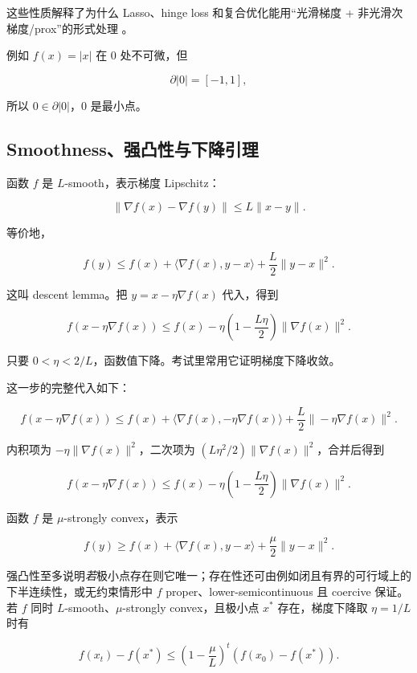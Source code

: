 这些性质解释了为什么 Lasso、hinge loss 和复合优化能用“光滑梯度 + 非光滑次梯度/prox”的形式处理 \parencite{nesterov2018convex,beck2017first}。

例如 \(f(x)=|x|\) 在 \(0\) 处不可微，但

\[
  \partial |0|=[-1,1],
\]

所以 \(0\in\partial |0|\)，\(0\) 是最小点。

\subsection{Smoothness、强凸性与下降引理}


函数 \(f\) 是 \(L\)-smooth，表示梯度 Lipschitz：

\[
  \|\nabla f(x)-\nabla f(y)\|
  \le
  L\|x-y\|.
\]

等价地，

\[
  f(y)
  \le
  f(x)+\langle\nabla f(x),y-x\rangle
  +\frac{L}{2}\|y-x\|^2.
\]

这叫 descent lemma。把 \(y=x-\eta\nabla f(x)\) 代入，得到

\[
  f(x-\eta\nabla f(x))
  \le
  f(x)
  -
  \eta\left(1-\frac{L\eta}{2}\right)
  \|\nabla f(x)\|^2.
\]

只要 \(0<\eta<2/L\)，函数值下降。考试里常用它证明梯度下降收敛。

这一步的完整代入如下：

\[
  f(x-\eta\nabla f(x))
  \le
  f(x)
  +
  \langle\nabla f(x),-\eta\nabla f(x)\rangle
  +
  \frac{L}{2}\|-\eta\nabla f(x)\|^2.
\]

内积项为 \(-\eta\|\nabla f(x)\|^2\)，二次项为 \((L\eta^2/2)\|\nabla f(x)\|^2\)，合并后得到

\[
  f(x-\eta\nabla f(x))
  \le
  f(x)
  -
  \eta\left(1-\frac{L\eta}{2}\right)\|\nabla f(x)\|^2.
\]

函数 \(f\) 是 \(\mu\)-strongly convex，表示

\[
  f(y)\ge
  f(x)+\langle\nabla f(x),y-x\rangle
  +\frac{\mu}{2}\|y-x\|^2.
\]

强凸性至多说明\emph{若}极小点存在则它唯一；存在性还可由例如闭且有界的可行域上的下半连续性，或无约束情形中 \(f\) proper、lower-semicontinuous 且 coercive 保证。若 \(f\) 同时 \(L\)-smooth、\(\mu\)-strongly convex，且极小点 \(x^*\) 存在，梯度下降取 \(\eta=1/L\) 时有

\[
  f(x_t)-f(x^*)
  \le
  \left(1-\frac{\mu}{L}\right)^t
  \left(f(x_0)-f(x^*)\right).
\]

